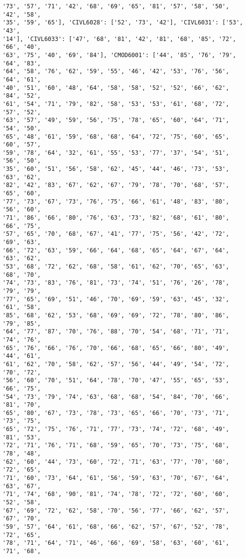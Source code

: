 \documentclass[11pt]{article}
\begin{document}
\begin{Verbatim}[commandchars=\\\{\}]
'73', '57', '71', '42', '68', '69', '65', '81', '57', '58', '50', '42', '58',
'35', '59', '65'], 'CIVL6028': ['52', '73', '42'], 'CIVL6031': ['53', '43',
'14'], 'CIVL6033': ['47', '68', '81', '42', '81', '68', '85', '72', '66', '40',
'63', '75', '40', '69', '84'], 'CMOD6001': ['44', '85', '76', '79', '64', '83',
'64', '58', '76', '62', '59', '55', '46', '42', '53', '76', '56', '64', '61',
'40', '51', '60', '48', '64', '58', '58', '52', '52', '66', '62', '84', '52',
'61', '54', '71', '79', '82', '58', '53', '53', '61', '68', '72', '57', '52',
'63', '57', '49', '59', '56', '75', '78', '65', '60', '64', '71', '54', '50',
'65', '48', '61', '59', '68', '68', '64', '72', '75', '60', '65', '60', '57',
'59', '78', '64', '32', '61', '55', '53', '77', '37', '54', '51', '56', '50',
'35', '60', '51', '56', '58', '62', '45', '44', '46', '73', '53', '63', '62',
'82', '42', '83', '67', '62', '67', '79', '78', '70', '68', '57', '65', '60',
'77', '73', '67', '73', '76', '75', '66', '61', '48', '83', '80', '56', '60',
'71', '86', '66', '80', '76', '63', '73', '82', '68', '61', '80', '66', '75',
'57', '65', '70', '68', '67', '41', '77', '75', '56', '42', '72', '69', '63',
'66', '72', '63', '59', '66', '64', '68', '65', '64', '67', '64', '63', '62',
'53', '68', '72', '62', '68', '58', '61', '62', '70', '65', '63', '68', '70',
'74', '73', '83', '76', '81', '73', '74', '51', '76', '26', '78', '79', '79',
'77', '65', '69', '51', '46', '70', '69', '59', '63', '45', '32', '61', '58',
'85', '68', '62', '53', '68', '69', '69', '72', '78', '80', '86', '79', '85',
'64', '77', '87', '70', '76', '88', '70', '54', '68', '71', '71', '74', '76',
'65', '76', '66', '76', '70', '66', '68', '65', '66', '80', '49', '44', '61',
'61', '62', '70', '58', '62', '57', '56', '44', '49', '54', '72', '70', '72',
'56', '60', '70', '51', '64', '78', '70', '47', '55', '65', '53', '66', '75',
'54', '73', '79', '74', '63', '68', '68', '54', '84', '70', '66', '81', '70',
'65', '80', '67', '73', '78', '73', '65', '66', '70', '73', '71', '73', '75',
'65', '72', '75', '76', '71', '77', '73', '74', '72', '68', '49', '81', '53',
'72', '71', '76', '71', '68', '59', '65', '70', '73', '75', '68', '78', '48',
'62', '60', '44', '73', '60', '72', '71', '63', '77', '70', '60', '72', '65',
'71', '60', '73', '64', '61', '56', '59', '63', '70', '67', '64', '63', '67',
'71', '74', '68', '90', '81', '74', '78', '72', '72', '60', '60', '52', '58',
'67', '69', '72', '62', '58', '70', '56', '77', '66', '62', '57', '67', '70',
'59', '57', '64', '61', '68', '66', '62', '57', '67', '52', '78', '72', '65',
'78', '71', '64', '71', '46', '66', '69', '58', '63', '60', '61', '71', '68',

\end{Verbatim}
\end{document}
